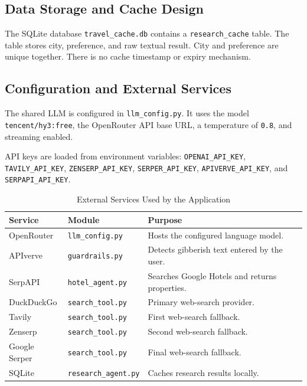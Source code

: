 \documentclass[12pt,a4paper]{report}
\begin{document}
\subsection{Data Storage and Cache Design}
\label{subsec:data-storage-cache}
The SQLite database \texttt{travel\_cache.db} contains a \texttt{research\_cache} table. The
table stores city, preference, and raw textual result. City and preference are unique together.
There is no cache timestamp or expiry mechanism.

\subsection{Configuration and External Services}
\label{subsec:configuration-services}
The shared LLM is configured in \texttt{llm\_config.py}. It uses the model
\texttt{tencent/hy3:free}, the OpenRouter API base URL, a temperature of \texttt{0.8}, and
streaming enabled.

API keys are loaded from environment variables:
\texttt{OPENAI\_API\_KEY}, \texttt{TAVILY\_API\_KEY}, \texttt{ZENSERP\_API\_KEY},
\texttt{SERPER\_API\_KEY}, \texttt{APIVERVE\_API\_KEY}, and \texttt{SERPAPI\_API\_KEY}.

\begin{table}[htbp]
\centering
\caption{External Services Used by the Application}
\label{tab:external-services}
\begin{tabularx}{\textwidth}{|>{\raggedright\arraybackslash}p{3.5cm}|>{\raggedright\arraybackslash}p{3.5cm}|X|}
\hline
\textbf{Service} & \textbf{Module} & \textbf{Purpose} \\
\hline
OpenRouter & \texttt{llm\_config.py} & Hosts the configured language model. \\
\hline
APIverve & \texttt{guardrails.py} & Detects gibberish text entered by the user. \\
\hline
SerpAPI & \texttt{hotel\_agent.py} & Searches Google Hotels and returns properties. \\
\hline
DuckDuckGo & \texttt{search\_tool.py} & Primary web-search provider. \\
\hline
Tavily & \texttt{search\_tool.py} & First web-search fallback. \\
\hline
Zenserp & \texttt{search\_tool.py} & Second web-search fallback. \\
\hline
Google Serper & \texttt{search\_tool.py} & Final web-search fallback. \\
\hline
SQLite & \texttt{research\_agent.py} & Caches research results locally. \\
\hline
\end{tabularx}
\end{table}
\end{document}

